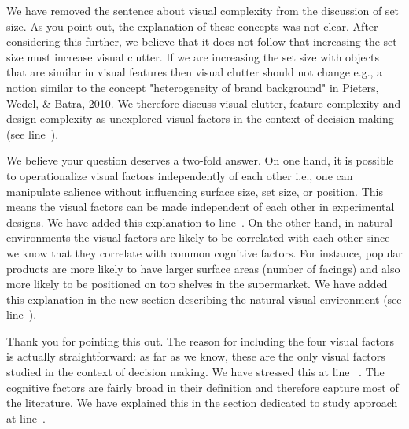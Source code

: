 
We have removed the sentence about visual complexity from the discussion of set size. As you point out, the explanation of these concepts was not clear. After considering this further, we believe that it does not follow that increasing the set size must increase visual clutter. If we are increasing the set size with objects that are similar in visual features then visual clutter should not change e.g., a notion similar to the concept "heterogeneity of brand background" in Pieters, Wedel, \& Batra, 2010. We therefore discuss visual clutter, feature complexity and design complexity as unexplored visual factors in the context of decision making (see line~).  



We believe your question deserves a two-fold answer. On one hand, it is possible to operationalize visual factors independently of each other i.e., one can manipulate salience without influencing surface size, set size, or position. This means the visual factors can be made independent of each other in experimental designs. We have added this explanation to line~. On the other hand, in natural environments the visual factors are likely to be correlated with each other since we know that they correlate with common cognitive factors. For instance, popular products are more likely to have larger surface areas (number of facings) and also more likely to be positioned on top shelves in the supermarket. We have added this explanation in the new section describing the natural visual environment (see line~). 



Thank you for pointing this out. The reason for including the four visual factors is actually straightforward: as far as we know, these are the only visual factors studied in the context of decision making. We have stressed this at line ~. The cognitive factors are fairly broad in their definition and therefore capture most of the literature. We have explained this in the section dedicated to study approach at line~.


